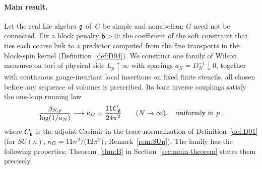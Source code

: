 \paragraph{Main result.}
Let the real Lie algebra $\mathfrak{g}$ of~$G$ be simple and nonabelian; $G$ need not be connected. Fix a block penalty $\mathsf{b}>0$: the coefficient of the soft constraint that ties each coarse link to a predictor computed from the fine transports in the block-spin kernel (Definition~\ref{def:D04}). We construct one family of Wilson measures on tori of physical side $L_p\uparrow\infty$ with spacings $a_N=D_N^{-1}\downarrow0$, together with continuous gauge-invariant local insertions on fixed finite stencils, all chosen before any sequence of volumes is prescribed. Its bare inverse couplings satisfy the one-loop running law
\begin{equation}\label{eq:intro-running}
\frac{\beta_{N,p}}{\log(1/a_N)}\longrightarrow\kappa_G=\frac{11C_{\mathfrak{g}}}{24\pi^2}
\qquad(N\to\infty),\quad\text{uniformly in }p\,,
\end{equation}%
where $C_{\mathfrak{g}}$ is the adjoint Casimir in the trace normalization of Definition~\ref{def:D01} (for $SU(n)$, $\kappa_G=11n^2/(12\pi^2)$; Remark~\ref{rem:SUn}). The family has the following properties; Theorem~\ref{thm:B} in Section~\ref{sec:main-theorem} states them precisely.
